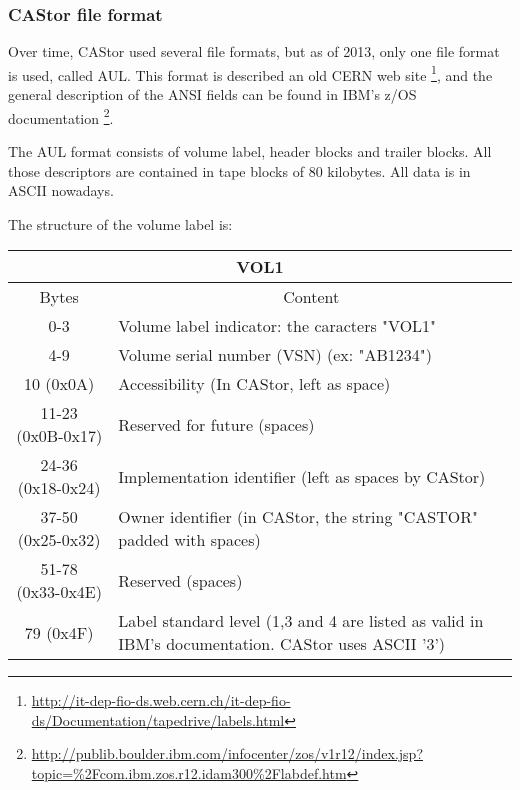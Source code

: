 \subsubsection{CAStor file format}
Over time, CAStor used several file formats, but as of 2013, only one file format
is used, called AUL. This format is described an old CERN web site
\footnote{ \href{http://it-dep-fio-ds.web.cern.ch/it-dep-fio-ds/Documentation/tapedrive/labels.html}{http://it-dep-fio-ds.web.cern.ch/it-dep-fio-ds/Documentation/tapedrive/labels.html} },
and the general description of the ANSI fields can be found in IBM's z/OS documentation
\footnote{ \href{http://publib.boulder.ibm.com/infocenter/zos/v1r12/index.jsp?topic=\%2Fcom.ibm.zos.r12.idam300\%2Flabdef.htm}{http://publib.boulder.ibm.com/infocenter/zos/v1r12/index.jsp?topic=\%2Fcom.ibm.zos.r12.idam300\%2Flabdef.htm} }.

The AUL format consists of volume label, header blocks and trailer blocks. All those
descriptors are contained in tape blocks of 80 kilobytes. All data is in ASCII nowadays.

The structure of the volume label is:

\begin{center}
\begin{tabularx}{\textwidth}{ |c|X| }
  \hline
  \multicolumn{2}{|c|}{VOL1} \\
  \hline
  Bytes & \multicolumn{1}{c|}{Content} \\
  \hline \hline
  0-3 & Volume label indicator: the caracters "VOL1" \\
  \hline
  4-9 & Volume serial number (VSN) (ex: "AB1234") \\
  \hline
  10 (0x0A) & Accessibility (In CAStor, left as space) \\
  \hline
  11-23 (0x0B-0x17) & Reserved for future (spaces) \\
  \hline
  24-36 (0x18-0x24) & Implementation identifier (left as spaces by CAStor) \\
  \hline
  37-50 (0x25-0x32) & Owner identifier (in CAStor, the string "CASTOR" padded with spaces)\\
  \hline
  51-78 (0x33-0x4E) & Reserved (spaces) \\
  \hline
  79 (0x4F) & Label standard level (1,3 and 4 are listed as valid in IBM's documentation. CAStor uses ASCII '3') \\
  \hline

\end{tabularx}
\end{center}

